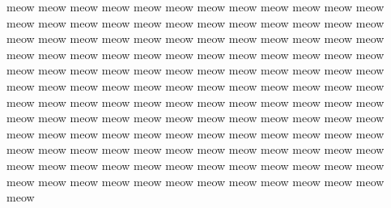 %
%

meow meow meow meow meow meow meow meow meow meow meow meow meow meow meow meow meow meow meow meow meow meow meow meow meow meow meow meow meow meow meow meow meow meow meow meow meow meow meow meow meow meow meow meow meow meow meow meow meow meow meow meow meow meow meow meow meow meow meow meow meow meow meow meow meow meow meow meow meow meow meow meow meow meow meow meow meow meow meow meow meow meow meow meow meow meow meow meow meow meow meow meow meow meow meow meow meow meow meow meow meow meow meow meow meow meow meow meow meow meow meow meow meow meow meow meow meow meow meow meow meow meow meow meow meow meow meow meow meow meow meow meow meow meow meow meow meow meow meow meow meow meow meow meow meow 